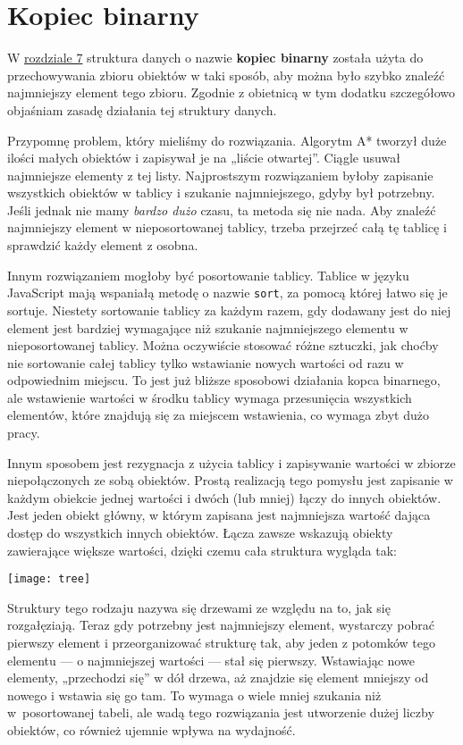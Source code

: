 \chapter{Kopiec binarny}
\label{app:2}
  
W \hyperref[chap:7]{rozdziale 7} struktura danych o nazwie \textbf{kopiec binarny} została użyta do przechowywania zbioru obiektów w taki sposób, aby można było szybko znaleźć najmniejszy element tego zbioru. Zgodnie z obietnicą w tym dodatku szczegółowo objaśniam zasadę działania tej struktury danych.

  
Przypomnę problem, który mieliśmy do rozwiązania. Algorytm A* tworzył duże ilości małych obiektów i zapisywał je na „liście otwartej”. Ciągle usuwał najmniejsze elementy z tej listy. Najprostszym rozwiązaniem byłoby zapisanie wszystkich obiektów w tablicy i szukanie najmniejszego, gdyby był potrzebny. Jeśli jednak nie mamy \emph{bardzo dużo} czasu, ta metoda się nie nada. Aby znaleźć najmniejszy element w nieposortowanej tablicy, trzeba przejrzeć całą tę tablicę i sprawdzić każdy element z osobna.

  
Innym rozwiązaniem mogłoby być posortowanie tablicy. Tablice w języku JavaScript mają wspaniałą metodę o nazwie \texttt{sort}, za pomocą której łatwo się je sortuje. Niestety sortowanie tablicy za każdym razem, gdy dodawany jest do niej element jest bardziej wymagające niż szukanie najmniejszego elementu w nieposortowanej tablicy. Można oczywiście stosować różne sztuczki, jak choćby nie sortowanie całej tablicy tylko wstawianie nowych wartości od razu w odpowiednim miejscu. To jest już bliższe sposobowi działania kopca binarnego, ale wstawienie wartości w środku tablicy wymaga przesunięcia wszystkich elementów, które znajdują się za miejscem wstawienia, co wymaga zbyt dużo pracy.

  
Innym sposobem jest rezygnacja z użycia tablicy i zapisywanie wartości w zbiorze niepołączonych ze sobą obiektów. Prostą realizacją tego pomysłu jest zapisanie w każdym obiekcie jednej wartości i dwóch (lub mniej) łączy do innych obiektów. Jest jeden obiekt główny, w którym zapisana jest najmniejsza wartość dająca dostęp do wszystkich innych obiektów. Łącza zawsze wskazują obiekty zawierające większe wartości, dzięki czemu cała struktura wygląda tak:

\bigskip 
 \centerline{\texttt{[image: tree]}} 
\smallskip
  
Struktury tego rodzaju nazywa się drzewami ze względu na to, jak się rozgałęziają. Teraz gdy potrzebny jest najmniejszy element, wystarczy pobrać pierwszy element i przeorganizować strukturę tak, aby jeden z potomków tego elementu — o najmniejszej wartości — stał się pierwszy. Wstawiając nowe elementy, „przechodzi się” w dół drzewa, aż znajdzie się element mniejszy od nowego i wstawia się go tam. To wymaga o wiele mniej szukania niż w~posortowanej tabeli, ale wadą tego rozwiązania jest utworzenie dużej liczby obiektów, co również ujemnie wpływa na wydajność.


